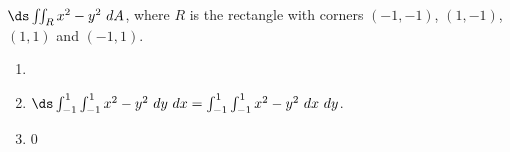 {$\ds \iint_R x^2-y^2\ dA$, where $R$ is the rectangle with corners $(-1,-1)$, $(1,-1)$, $(1,1)$ and $(-1,1)$.
}
{\begin{enumerate}
\item \noindent \begin{minipage}{.9\linewidth}
\end{minipage}
\item	$\ds \int_{-1}^1\int_{-1}^{1}x^2-y^2\ dy\ dx = \int_{-1}^1\int_{-1}^{1}x^2-y^2\ dx\ dy$.
\item 0
\end{enumerate}
}